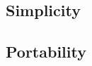 \documentclass[11pt]{article} %
\begin{document}
\subsection{Simplicity}
\subsection{Portability}




%
%

\end{document}
